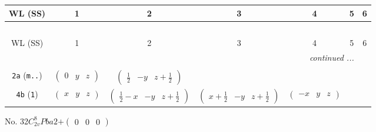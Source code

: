 \documentclass[fleqn,9pt,landscape]{jsarticle}
\begin{document}
\begin{center}
\renewcommand{\arraystretch}{1.2}
\begin{longtable}{ccccccc}
 \hline \hline
WL (SS) & 1 & 2 & 3 & 4 & 5 & 6 \\ \hline \endfirsthead

\multicolumn{6}{l}{\tablename\ \thetable{}} \\
 \hline \hline
WL (SS) & 1 & 2 & 3 & 4 & 5 & 6 \\ \hline \endhead

 \hline \hline
\multicolumn{6}{r}{\footnotesize\it continued ...} \\ \endfoot

 \hline \hline
\multicolumn{6}{r}{} \\ \endlastfoot

{\tt 2a} ({\tt m..}) & $ \begin{pmatrix} 0 & y & z \end{pmatrix} $ & $ \begin{pmatrix} \frac{1}{2} & - y & z + \frac{1}{2} \end{pmatrix} $ & $  $ & $  $ \\ \hline
{\tt 4b} ({\tt 1}) & $ \begin{pmatrix} x & y & z \end{pmatrix} $ & $ \begin{pmatrix} \frac{1}{2} - x & - y & z + \frac{1}{2} \end{pmatrix} $ & $ \begin{pmatrix} x + \frac{1}{2} & - y & z + \frac{1}{2} \end{pmatrix} $ & $ \begin{pmatrix} - x & y & z \end{pmatrix} $ \\
\end{longtable}
\end{center}
\newpage
No. 32\quad$C_{2v}^{8}$\quad$Pba2$\quad[ orthorhombic ]\quad$+\begin{pmatrix} 0 & 0 & 0 \end{pmatrix}$
\end{document}
